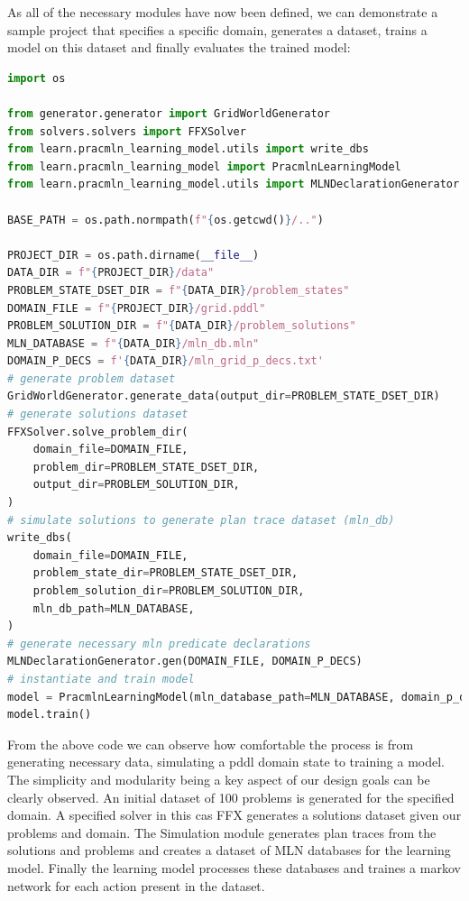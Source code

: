 As all of the necessary modules have now been defined, we can demonstrate a sample project that specifies a specific domain, generates a dataset, trains a model on this dataset and finally evaluates the trained model:

\begin{lstlisting}[language=Python]
import os

from generator.generator import GridWorldGenerator
from solvers.solvers import FFXSolver
from learn.pracmln_learning_model.utils import write_dbs
from learn.pracmln_learning_model import PracmlnLearningModel
from learn.pracmln_learning_model.utils import MLNDeclarationGenerator

BASE_PATH = os.path.normpath(f"{os.getcwd()}/..")

PROJECT_DIR = os.path.dirname(__file__)
DATA_DIR = f"{PROJECT_DIR}/data"
PROBLEM_STATE_DSET_DIR = f"{DATA_DIR}/problem_states"
DOMAIN_FILE = f"{PROJECT_DIR}/grid.pddl"
PROBLEM_SOLUTION_DIR = f"{DATA_DIR}/problem_solutions"
MLN_DATABASE = f"{DATA_DIR}/mln_db.mln"
DOMAIN_P_DECS = f'{DATA_DIR}/mln_grid_p_decs.txt'
# generate problem dataset
GridWorldGenerator.generate_data(output_dir=PROBLEM_STATE_DSET_DIR)
# generate solutions dataset
FFXSolver.solve_problem_dir(
    domain_file=DOMAIN_FILE,
    problem_dir=PROBLEM_STATE_DSET_DIR,
    output_dir=PROBLEM_SOLUTION_DIR,
)
# simulate solutions to generate plan trace dataset (mln_db)
write_dbs(
    domain_file=DOMAIN_FILE,
    problem_state_dir=PROBLEM_STATE_DSET_DIR,
    problem_solution_dir=PROBLEM_SOLUTION_DIR,
    mln_db_path=MLN_DATABASE,
)
# generate necessary mln predicate declarations
MLNDeclarationGenerator.gen(DOMAIN_FILE, DOMAIN_P_DECS)
# instantiate and train model
model = PracmlnLearningModel(mln_database_path=MLN_DATABASE, domain_p_decs_path=DOMAIN_P_DECS)
model.train()
\end{lstlisting}

From the above code we can observe how comfortable the process is from generating necessary data, simulating a pddl domain state to training a model.
The simplicity and modularity being a key aspect of our design goals can be clearly observed.
An initial dataset of 100 problems is generated for the specified domain.
A specified solver in this cas FFX generates a solutions dataset given our problems and domain.
The Simulation module generates plan traces from the solutions and problems and creates a dataset of MLN databases for the learning model.
Finally the learning model processes these databases and traines a markov network for each action present in the dataset.








